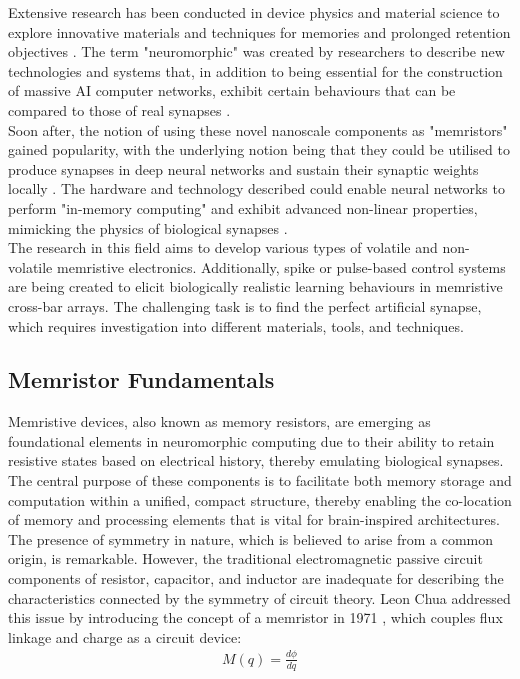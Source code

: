 Extensive research has been conducted in device physics and material science to explore innovative materials and techniques for memories and prolonged retention objectives \cite{indiveri2021introducing}. The term "neuromorphic" was created by researchers to describe new technologies and systems that, in addition to being essential for the construction of massive AI computer networks, exhibit certain behaviours that can be compared to those of real synapses \cite{di2009circuit}. \\

\noindent Soon after, the notion of using these novel nanoscale components as "memristors" gained popularity, with the underlying notion being that they could be utilised to produce synapses in deep neural networks and sustain their synaptic weights locally \cite{jo2010nanoscale}. The hardware and technology described could enable neural networks to perform "in-memory computing" and exhibit advanced non-linear properties, mimicking the physics of biological synapses \cite{saighi2015plasticity}. \\

\noindent The research in this field aims to develop various types of volatile and non-volatile memristive electronics. Additionally, spike or pulse-based control systems are being created to elicit biologically realistic learning behaviours in memristive cross-bar arrays. The challenging task is to find the perfect artificial synapse, which requires investigation into different materials, tools, and techniques.

\subsection[Memristor Fundamentals]{Memristor Fundamentals}

Memristive devices, also known as memory resistors, are emerging as foundational elements in neuromorphic computing due to their ability to retain resistive states based on electrical history, thereby emulating biological synapses. The central purpose of these components is to facilitate both memory storage and computation within a unified, compact structure, thereby enabling the co-location of memory and processing elements that is vital for brain-inspired architectures.\\

\noindent The presence of symmetry in nature, which is believed to arise from a common origin, is remarkable.  However, the traditional electromagnetic passive circuit components of resistor, capacitor, and inductor are inadequate for describing the characteristics connected by the symmetry of circuit theory. Leon Chua addressed this issue by introducing the concept of a memristor in 1971 \cite{chua1971memristor}, which couples flux linkage and charge as a circuit device:
\begin{align}
    M(q) = \frac{d\phi}{dq} \label{eq:2.22}
\end{align}

